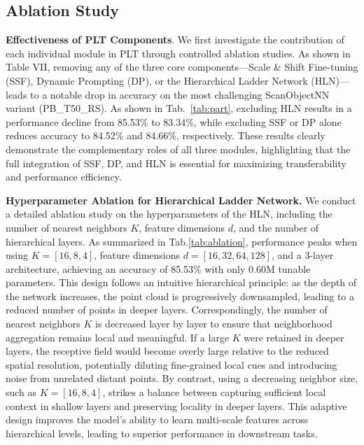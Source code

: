 









\subsection{Ablation Study}

\textbf{Effectiveness of PLT Components}. We first investigate the contribution of each individual module in PLT through controlled ablation studies. As shown in Table VII, removing any of the three core components—Scale \& Shift Fine-tuning (SSF), Dynamic Prompting (DP), or the Hierarchical Ladder Network (HLN)—leads to a notable drop in accuracy on the most challenging ScanObjectNN variant (PB\_T50\_RS). As shown in Tab.~\ref{tab:part}, excluding HLN results in a performance decline from 85.53\% to 83.34\%, while excluding SSF or DP alone reduces accuracy to 84.52\% and 84.66\%, respectively. These results clearly demonstrate the complementary roles of all three modules, highlighting that the full integration of SSF, DP, and HLN is essential for maximizing transferability and performance efficiency.

\textbf{Hyperparameter Ablation for Hierarchical Ladder Network.} We conduct a detailed ablation study on the hyperparameters of the HLN, including the number of nearest neighbors $K$, feature dimensions $d$, and the number of hierarchical layers. As summarized in Tab.\ref{tab:ablation}, performance peaks when using $K=[16,8,4]$, feature dimensions $d=[16,32,64,128]$, and a 3-layer architecture, achieving an accuracy of 85.53\% with only 0.60M tunable parameters. This design follows an intuitive hierarchical principle: as the depth of the network increases, the point cloud is progressively downsampled, leading to a reduced number of points in deeper layers. Correspondingly, the number of nearest neighbors $K$ is decreased layer by layer to ensure that neighborhood aggregation remains local and meaningful. If a large $K$ were retained in deeper layers, the receptive field would become overly large relative to the reduced spatial resolution, potentially diluting fine-grained local cues and introducing noise from unrelated distant points. By contrast, using a decreasing neighbor size, such as $K=[16,8,4]$, strikes a balance between capturing sufficient local context in shallow layers and preserving locality in deeper layers. This adaptive design improves the model’s ability to learn multi-scale features across hierarchical levels, leading to superior performance in downstream tasks.

